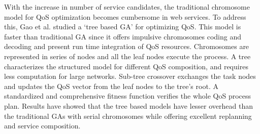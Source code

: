 \documentclass[journal]{IEEEtran}
\begin{document}
With the increase in number of service candidates, the traditional chromosome model for QoS optimization becomes cumbersome in web services. To address this, Gao et al. \cite{gao2007qos} studied a `tree based GA' for optimizing QoS. This model is faster than traditional GA since it offers impulsive chromosomes coding and decoding and present run time integration of QoS resources. Chromosomes are represented in series of nodes and all the leaf nodes execute the process. A tree characterizes the structured model for different QoS composition, and requires less computation for large networks. Sub-tree crossover exchanges the task nodes and updates the QoS vector from the leaf nodes to the tree's root. A standardized and comprehensive fitness function verifies the whole QoS process plan. Results have showed that the tree based models have lesser overhead than the traditional GAs with serial chromosomes while offering excellent replanning and service composition.
\end{document}
